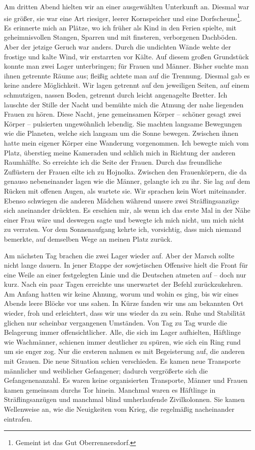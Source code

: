 Am dritten Abend hielten wir an einer ausgewählten Unterkunft an. Diesmal war sie größer, sie war eine Art riesiger, leerer Kornspeicher und eine Dorfscheune\footnote{Gemeint ist das Gut Oberrennersdorf.}. Es erinnerte mich an Plätze, wo ich früher als Kind in den Ferien spielte, mit geheimnisvollen Stangen, Sparren und mit finsteren, verborgenen Dachböden. Aber der jetzige Geruch war anders. Durch die undichten Wände wehte der frostige und kalte Wind, wir erstarrten vor Kälte. Auf diesem großen Grundstück konnte man zwei Lager unterbringen; für Frauen und Männer. Bisher suchte man ihnen getrennte Räume aus; fleißig achtete man auf die Trennung. Diesmal gab es keine andere Möglichkeit. Wir lagen getrennt auf den jeweiligen Seiten, auf einem schmutzigen, nassen Boden, getrennt durch leicht angenagelte Bretter. Ich lauschte der Stille der Nacht und bemühte mich die Atmung der nahe liegenden Frauen zu hören. Diese Nacht, jene gemeinsamen Körper -- schöner gesagt zwei Körper -- pulsierten ungewöhnlich lebendig. Sie machten langsame Bewegungen wie die Planeten, welche sich langsam um die Sonne bewegen. Zwischen ihnen hatte mein eigener Körper eine Wanderung vorgenommen. Ich bewegte mich vom Platz, überstieg meine Kameraden und schlich mich in Richtung der anderen Raumhälfte. So erreichte ich die Seite der Frauen. Durch das freundliche Zuflüstern der Frauen eilte ich zu Hojnolka. Zwischen den Frauenkörpern, die da genauso nebeneinander lagen wie die Männer, gelangte ich zu ihr. Sie lag auf dem Rücken mit offenen Augen, als wartete sie. Wir sprachen kein Wort miteinander. Ebenso schwiegen die anderen Mädchen während unsere zwei Sträflingsanzüge sich aneinander drückten. Es erschien mir, als wenn ich das erste Mal in der Nähe einer Frau wäre und deswegen sagte und bewegte ich mich nicht, um mich nicht zu verraten. Vor dem Sonnenaufgang kehrte ich, vorsichtig, dass mich niemand bemerkte, auf demselben Wege an meinen Platz zurück.

Am nächsten Tag brachen die zwei Lager wieder auf. Aber der Marsch sollte nicht lange dauern. In jener Etappe der sowjetischen Offensive hielt die Front für eine Weile an einer festgelegten Linie und die Deutschen atmeten auf -- doch nur kurz. Nach ein paar Tagen erreichte uns unerwartet der Befehl zurückzukehren. Am Anfang hatten wir keine Ahnung, worum und wohin es ging, bis wir eines Abends leere Blöcke vor uns sahen. In Kürze fanden wir uns am bekannten Ort wieder, froh und erleichtert, dass wir uns wieder da zu sein. Ruhe und Stabilität glichen nur scheinbar vergangenen Umständen. Von Tag zu Tag wurde die Belagerung immer offensichtlicher. Alle, die sich im Lager aufhielten, Häftlinge wie Wachmänner, schienen immer deutlicher zu spüren, wie sich ein Ring rund um sie enger zog. Nur die ersteren nahmen es mit Begeisterung auf, die anderen mit Grauen. Die neue Situation schien verschieden. Es kamen neue Transporte männlicher und weiblicher Gefangener; dadurch vergrößerte sich die Gefangenenanzahl. Es waren keine organisierten Transporte, Männer und Frauen kamen gemeinsam durchs Tor hinein. Manchmal waren es Häftlinge in Sträflingsanzügen und manchmal blind umherlaufende Zivilkolonnen. Sie kamen Wellenweise an, wie die Neuigkeiten vom Krieg, die regelmäßig nacheinander eintrafen.

